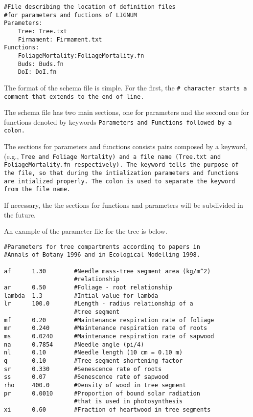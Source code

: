 \begin{verbatim}
#File describing the location of definition files
#for parameters and fuctions of LIGNUM
Parameters:
    Tree: Tree.txt 
    Firmament: Firmament.txt
Functions:
    FoliageMortality:FoliageMortality.fn
    Buds: Buds.fn
    DoI: DoI.fn
\end{verbatim}

The format of the schema file is simple. For the first, the \tt \# \rm
character starts a comment that extends to the end of line.  

The schema file has two main sections, one for parameters and
the second one for functions denoted by keywords 
\tt Parameters \rm and \tt Functions \rm followed by a colon.
 
The sections for parameters and functions consists pairs
composed by a keyword,(e.g., \tt Tree \rm and 
\tt Foliage Mortality\rm) and a file name
(\tt Tree.txt \rm and \tt FoliageMortality.fn \rm respectively). 
The keyword tells the purpose of the file, so that
during the intialization parameters and functions are
intialized properly. The colon is used to separate the
keyword from the file name.

If necessary, the the sections for functions and parameters
will be subdivided in the future. 

An example of the parameter file for the tree is below.

\begin{verbatim}
#Parameters for tree compartments according to papers in
#Annals of Botany 1996 and in Ecological Modelling 1998.

af      1.30        #Needle mass-tree segment area (kg/m^2)
                    #relationship
ar      0.50        #Foliage - root relationship 
lambda  1.3         #Intial value for lambda
lr      100.0       #Length - radius relationship of a 
                    #tree segment
mf      0.20        #Maintenance respiration rate of foliage
mr      0.240       #Maintenance respiration rate of roots
ms      0.0240      #Maintenance respiration rate of sapwood
na      0.7854      #Needle angle (pi/4)
nl      0.10        #Needle length (10 cm = 0.10 m) 
q       0.10        #Tree segment shortening factor
sr      0.330       #Senescence rate of roots
ss      0.07        #Senescence rate of sapwood
rho     400.0       #Density of wood in tree segment
pr      0.0010      #Proportion of bound solar radiation
                    #that is used in photosynthesis
xi      0.60        #Fraction of heartwood in tree segments
\end{verbatim}

